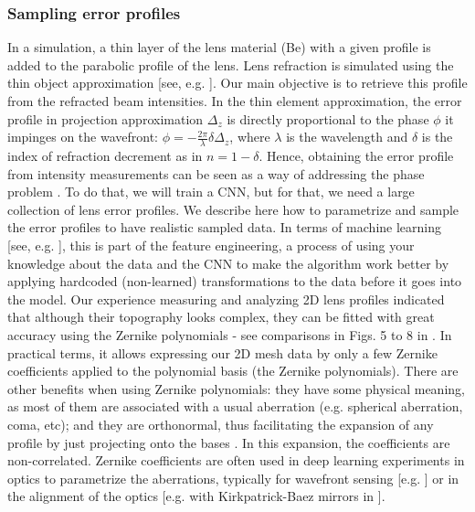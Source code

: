 \documentclass{iucr}
\newcommand{\inred}[1]{{\color{black}#1}}
\begin{document}
\subsubsection{Sampling error profiles}
In a simulation, a thin layer of the lens material (Be) with a given profile is added to the parabolic profile of the lens. Lens refraction is simulated using the thin object approximation \inred{[see, e.g. \cite{Celestre2020, multioptics}]}. Our main objective is to retrieve this profile from the refracted beam intensities. \inred{In the thin element approximation, the error profile in projection approximation $\Delta_z$ is directly proportional to the phase $\phi$ it impinges on the wavefront: $\phi = - \frac{2\pi}{\lambda} \delta \Delta_z$, where $\lambda$ is the wavelength and $\delta$ is the index of refraction decrement as in $n=1-\delta$. Hence, obtaining the error profile from intensity measurements can be seen as a way of addressing the phase problem \cite{Taylor1981, Klibanov1995}.}
To do that, we will train a CNN, but for that, we need a large collection of lens error profiles. We describe here how to parametrize and sample the error profiles to have realistic sampled data. In terms of machine learning [see, e.g. \cite{chollet_book}], this is part of the feature engineering, a process of using your knowledge about the data and the CNN to make the algorithm work better by applying hardcoded (non-learned) transformations to the data before it goes into the model.
Our experience measuring and analyzing 2D lens profiles indicated that although their topography looks complex, they can be fitted with great accuracy using the Zernike polynomials \inred{- see comparisons in Figs. 5 to 8 in \cite{Celestre2020}}. In practical terms, it allows expressing our 2D mesh data by only a few Zernike coefficients applied to the polynomial basis (the Zernike polynomials). There are other benefits when using Zernike polynomials: they have some physical meaning, as most of them are associated with a usual aberration (e.g. spherical aberration, coma, etc); and they are orthonormal, thus facilitating the expansion of any profile by just projecting onto the bases \inred{\cite{Mahajan2011}}. In this expansion, the coefficients are non-correlated. Zernike coefficients are often used in deep learning experiments in optics to parametrize the aberrations, typically for wavefront sensing [e.g. \cite{Saha2020}] or in the alignment of the optics [e.g. with Kirkpatrick-Baez mirrors in \cite{Luiz2022}]. 
\end{document}
